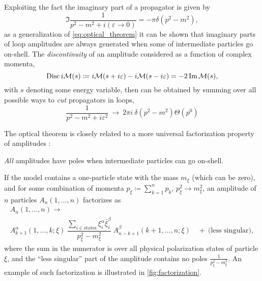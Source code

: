 
Exploiting the fact the imaginary part of a propagator is given by
\begin{equation}
  \Im\frac{1}{p^2-m^2+i(\varepsilon \to 0)} = -\pi\delta(p^2-m^2),
\end{equation}
as a generalization of \cref{eq:optical_theorem} it can be shown \cite{Eden:1966dnq,Cutkosky1960}
that imaginary parts of loop amplitudes are always generated when some of intermediate particles go on-shell.
The \emph{discontinuity} of an amplitude considered as a function of complex momenta,
\begin{equation}
  \operatorname{Disc} i\mathcal{M}(s) \coloneqq i\mathcal{M}(s+i\varepsilon)-i\mathcal{M}(s-i\varepsilon) = -2\Im \mathcal{M}(s),
\end{equation}
with $s$ denoting some energy variable,
then can be obtained \cite{Cutkosky1960} by summing over all possible ways to \emph{cut} propagators in loops,
\begin{equation} \label{eq:cut}
  \frac{1}{p^2-m^2+i\varepsilon^2} ~\longrightarrow~ 2\pi i ~\delta(p^2-m^2) \Theta(p^{0})
\end{equation}

The optical theorem is closely related to
a more universal factorization property of amplitudes \cite{Weinberg:1995mt}:
\begin{mdframed}
  \centering
  \emph{All} amplitudes have poles when intermediate particles can go on-shell.
\end{mdframed}
If the model contains a one-particle state with the mass $m_\xi$ (which can be zero),
and for some combination of momenta $p_\xi \coloneqq  \sum_{k=1}^{n} p_k$, $p_\xi^2 \to m_\xi^2$,
an amplitude of $n$ particles $A_n(1,\ldots{},n)$ factorizes as
\begin{multline} \label{eq:factorization_pole}
  A_n(1,\ldots{},n) \longrightarrow \\
    A^\alpha_{k+1}(1,\ldots{},k;\xi) ~
    \dfrac{\sum_{i \in \text{states}} \xi^\alpha_i \bar\xi^\beta_i }{p_\xi^2-m_\xi^2}~ A^\beta_{n-k+1}(k+1,\ldots{},n;\xi) \quad+~ \text{(less singular)},
\end{multline}
where the sum in the numerator is over all physical polarization states of particle $\xi$, 
and the ``less singular'' part of the amplitude contains no poles $\frac{1}{p_\xi^2-m_\xi^2}$.
An example of such factorization is illustrated in \cref{fig:factorization}.

